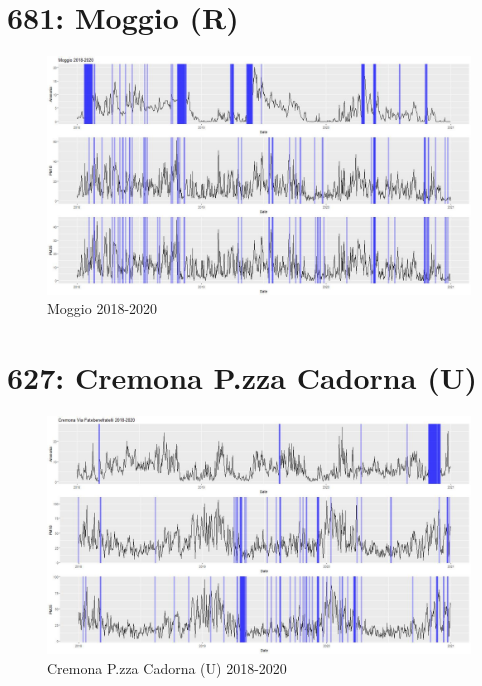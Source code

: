 \documentclass{article}
\begin{document}
\section{681: Moggio (R)}
\begin{figure}[H]
  \centering
  \includegraphics[scale = 0.45]{Picture/Moggio 2018-2020.jpeg}
  \caption{Moggio 2018-2020}
  \centering
\end{figure}

\section{627: Cremona P.zza Cadorna (U)}
\begin{figure}[H]
  \centering
  \includegraphics[scale = 0.45]{Picture/Cremona Via Fatebenefratelli 2018-2020.jpeg}
  \caption{Cremona P.zza Cadorna (U) 2018-2020}
  \centering
\end{figure}
\end{document}
